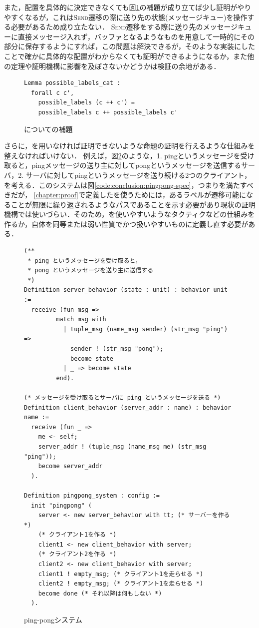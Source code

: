 また，配置を具体的に決定できなくても図\ref{code:conclusion:possible-labels-cat}の補題が成り立てば少し証明がやりやすくなるが，これは\textsc{Send}遷移の際に送り先の状態(メッセージキュー)を操作する必要があるため成り立たない．
\textsc{Send}遷移をする際に送り先のメッセージキューに直接メッセージ入れず，バッファとなるようなものを用意して一時的にその部分に保存するようにすれば，この問題は解決できるが，そのような実装にしたことで確かに具体的な配置がわからなくても証明ができるようになるか，また他の定理や証明機構に影響を及ぼさないかどうかは検証の余地がある．


\begin{figure}[tp]
\begin{lstlisting}
Lemma possible_labels_cat :
  forall c c',
    possible_labels (c ++ c') =
    possible_labels c ++ possible_labels c'
\end{lstlisting}
\caption{についての補題}\label{code:conclusion:possible-labels-cat}
\end{figure}


さらに，\fairness を用いなければ証明できないような命題の証明を行えるような仕組みを整えなければいけない．
例えば，図\ref{code:conclusion:pingpong}のような，1. pingというメッセージを受け取ると，pingメッセージの送り主に対してpongというメッセージを送信するサーバ，2. サーバに対してpingというメッセージを送り続ける2つのクライアント，を考える．このシステムは図\ref{code:conclusion:pingpong-spec}，つまりを満たすべきだが，
\ref{chapter:proof}で定義したを使うためには，あるラベルが遷移可能になることが無限に繰り返されるようなパスであることを示す必要があり現状の証明機構では使いづらい．そのため，を使いやすいようなタクティクなどの仕組みを作るか，自体を同等または弱い性質でかつ扱いやすいものに定義し直す必要がある．

\begin{figure}[tp]
\begin{lstlisting}
(**
 * ping というメッセージを受け取ると，
 * pong というメッセージを送り主に送信する
 *)
Definition server_behavior (state : unit) : behavior unit :=
  receive (fun msg =>
         match msg with
           | tuple_msg (name_msg sender) (str_msg "ping") =>
             sender ! (str_msg "pong");
             become state
           | _ => become state
         end).

(* メッセージを受け取るとサーバに ping というメッセージを送る *)
Definition client_behavior (server_addr : name) : behavior name :=
  receive (fun _ =>
    me <- self;
    server_addr ! (tuple_msg (name_msg me) (str_msg "ping"));
    become server_addr
  ).

Definition pingpong_system : config :=
  init "pingpong" (
    server <- new server_behavior with tt; (* サーバーを作る *)
    (* クライアント1を作る *)
    client1 <- new client_behavior with server;
    (* クライアント2を作る *)
    client2 <- new client_behavior with server;
    client1 ! empty_msg; (* クライアント1を走らせる *)
    client2 ! empty_msg; (* クライアント1を走らせる *)
    become done (* それ以降は何もしない *)
  ).
\end{lstlisting}
  \caption{ping-pongシステム}\label{code:conclusion:pingpong}
\end{figure}


